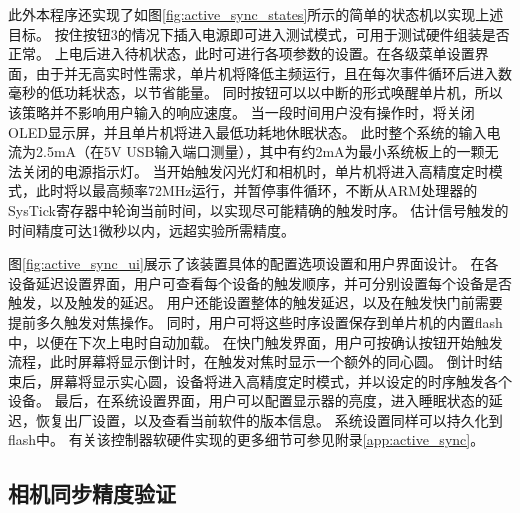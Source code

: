 此外本程序还实现了如图\ref{fig:active_sync_states}所示的简单的状态机以实现上述目标。
按住按钮3的情况下插入电源即可进入测试模式，可用于测试硬件组装是否正常。
上电后进入待机状态，此时可进行各项参数的设置。在各级菜单设置界面，由于并无高实时性需求，单片机将降低主频运行，且在每次事件循环后进入数毫秒的低功耗状态，以节省能量。
同时按钮可以以中断的形式唤醒单片机，所以该策略并不影响用户输入的响应速度。
当一段时间用户没有操作时，将关闭OLED显示屏，并且单片机将进入最低功耗地休眠状态。
此时整个系统的输入电流为2.5mA（在5V USB输入端口测量），其中有约2mA为最小系统板上的一颗无法关闭的电源指示灯。
当开始触发闪光灯和相机时，单片机将进入高精度定时模式，此时将以最高频率72MHz运行，并暂停事件循环，不断从ARM处理器的SysTick寄存器中轮询当前时间，以实现尽可能精确的触发时序。
估计信号触发的时间精度可达1微秒以内，远超实验所需精度。

图\ref{fig:active_sync_ui}展示了该装置具体的配置选项设置和用户界面设计。
在各设备延迟设置界面，用户可查看每个设备的触发顺序，并可分别设置每个设备是否触发，以及触发的延迟。
用户还能设置整体的触发延迟，以及在触发快门前需要提前多久触发对焦操作。
同时，用户可将这些时序设置保存到单片机的内置flash中，以便在下次上电时自动加载。
在快门触发界面，用户可按确认按钮开始触发流程，此时屏幕将显示倒计时，在触发对焦时显示一个额外的同心圆。
倒计时结束后，屏幕将显示实心圆，设备将进入高精度定时模式，并以设定的时序触发各个设备。
最后，在系统设置界面，用户可以配置显示器的亮度，进入睡眠状态的延迟，恢复出厂设置，以及查看当前软件的版本信息。
系统设置同样可以持久化到flash中。
有关该控制器软硬件实现的更多细节可参见附录\ref{app:active_sync}。

\subsection{相机同步精度验证}

